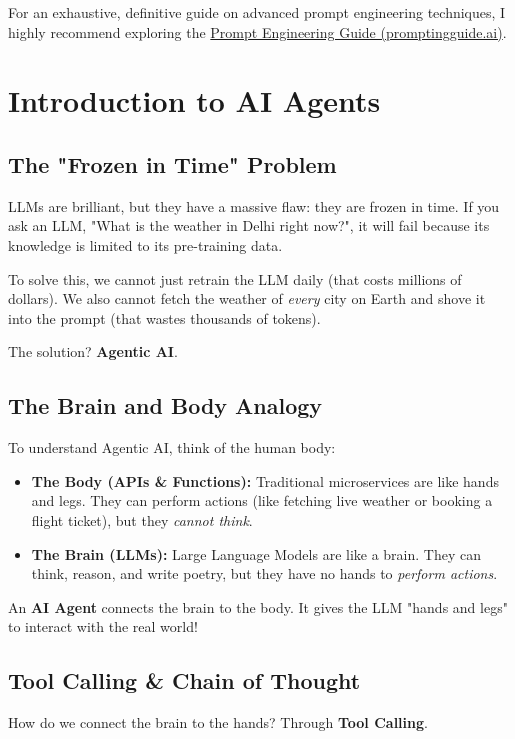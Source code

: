 \documentclass[12pt,a4paper,oneside]{book}
\begin{document}
\begin{tipbox}
	For an exhaustive, definitive guide on advanced prompt engineering techniques, I highly recommend exploring the \href{https://www.promptingguide.ai/}{Prompt Engineering Guide (promptingguide.ai)}.
\end{tipbox}

\chapter{Introduction to AI Agents}

\section{The "Frozen in Time" Problem}
LLMs are brilliant, but they have a massive flaw: they are frozen in time. If you ask an LLM, "What is the weather in Delhi right now?", it will fail because its knowledge is limited to its pre-training data.

To solve this, we cannot just retrain the LLM daily (that costs millions of dollars). We also cannot fetch the weather of \textit{every} city on Earth and shove it into the prompt (that wastes thousands of tokens).

The solution? \textbf{Agentic AI}.

\section{The Brain and Body Analogy}
To understand Agentic AI, think of the human body:
\begin{itemize}
	\item \textbf{The Body (APIs \& Functions):} Traditional microservices are like hands and legs. They can perform actions (like fetching live weather or booking a flight ticket), but they \textit{cannot think}.
	\item \textbf{The Brain (LLMs):} Large Language Models are like a brain. They can think, reason, and write poetry, but they have no hands to \textit{perform actions}.
\end{itemize}

An \textbf{AI Agent} connects the brain to the body. It gives the LLM "hands and legs" to interact with the real world!

\section{Tool Calling \& Chain of Thought}
How do we connect the brain to the hands? Through \textbf{Tool Calling}.
\end{document}
